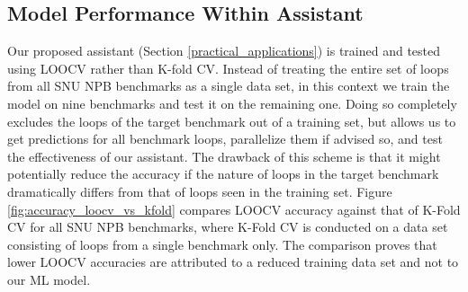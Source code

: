 \subsection{Model Performance Within Assistant}
\label{evaluation_loocv}
Our proposed assistant (Section \ref{practical_applications}) is trained and tested using LOOCV rather than K-fold CV. Instead of treating the entire set of loops from all SNU NPB benchmarks as a single data set, in this context we train the model on nine benchmarks and test it on the remaining one. Doing so completely excludes the loops of the target benchmark out of a training set, but allows us to get predictions for all benchmark loops, parallelize them if advised so, and test the effectiveness of our assistant. The drawback of this scheme is that it might potentially reduce the accuracy if the nature of loops in the target benchmark dramatically differs from that of loops seen in the training set. Figure \ref{fig:accuracy_loocv_vs_kfold} compares LOOCV accuracy against that of K-Fold CV for all SNU NPB benchmarks, where K-Fold CV is conducted on a data set consisting of loops from a single benchmark only. The comparison proves that lower LOOCV accuracies are attributed to a reduced training data set and not to our ML model.
